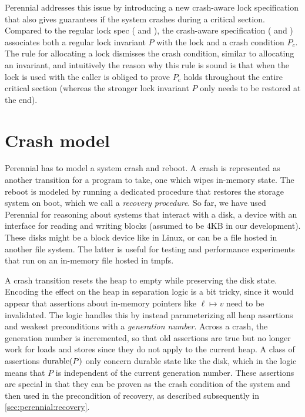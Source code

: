 Perennial addresses this issue by introducing a new crash-aware lock
specification that also gives guarantees if the system crashes during a critical
section. Compared to the regular lock spec ( and
), the crash-aware specification (
and ) associates both a regular lock invariant $P$ with
the lock and a crash condition $P_{c}$. The rule for allocating a lock dismisses
the crash condition, similar to allocating an invariant, and intuitively the
reason why this rule is sound is that when the lock is used with
 the caller is obliged to prove $P_{c}$ holds throughout
the entire critical section (whereas the stronger lock invariant $P$ only needs
to be restored at the end).

\section{Crash model}
\label{sec:perennial:crash-model}

Perennial has to model a system crash and reboot. A crash is represented as
another transition for a program to take, one which wipes in-memory state. The
reboot is modeled by running a dedicated procedure that restores the storage
system on boot, which we call a \emph{recovery procedure}. So far, we have used
Perennial for reasoning about systems that interact with a disk, a device with
an interface for reading and writing blocks (assumed to be 4KB in our
development). These disks might be a block device like  in Linux,
or can be a file hosted in another file system. The latter is useful for testing
and performance experiments that run on an in-memory file hosted in tmpfs.

A crash transition resets the heap to empty while preserving the disk state.
Encoding the effect on the heap in separation logic is a bit tricky, since it would appear that
assertions about in-memory pointers like $\ell \mapsto v$ need to be
invalidated. The logic handles this by instead parameterizing all heap
assertions and weakest preconditions with a \emph{generation number}. Across a
crash, the generation number is incremented, so that old assertions are true but
no longer work for loads and stores since they do not apply to the current heap.
A class of assertions $\operatorname{durable}(P)$ only concern durable state like the disk, which in the
logic means that $P$ is independent of the current generation number. These
assertions are special in that they can be proven as the crash condition of the
system and then used in the precondition of recovery, as described subsequently
in \cref{sec:perennial:recovery}.

